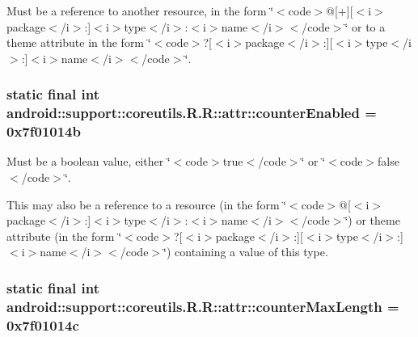 Must be a reference to another resource, in the form \char`\"{}$<$code$>$@\mbox{[}+\mbox{]}\mbox{[}$<$i$>$package$<$/i$>$:\mbox{]}$<$i$>$type$<$/i$>$:$<$i$>$name$<$/i$>$$<$/code$>$\char`\"{} or to a theme attribute in the form \char`\"{}$<$code$>$?\mbox{[}$<$i$>$package$<$/i$>$:\mbox{]}\mbox{[}$<$i$>$type$<$/i$>$:\mbox{]}$<$i$>$name$<$/i$>$$<$/code$>$\char`\"{}. \hypertarget{classandroid_1_1support_1_1coreutils_1_1_r_1_1attr_31dd65cecffac7130170d9f63a11055b}{
\subsubsection[{counterEnabled}]{\setlength{\rightskip}{0pt plus 5cm}static final int android::support::coreutils.R.R::attr::counterEnabled = 0x7f01014b}}
\label{classandroid_1_1support_1_1coreutils_1_1_r_1_1attr_31dd65cecffac7130170d9f63a11055b}


Must be a boolean value, either \char`\"{}$<$code$>$true$<$/code$>$\char`\"{} or \char`\"{}$<$code$>$false$<$/code$>$\char`\"{}. 

This may also be a reference to a resource (in the form \char`\"{}$<$code$>$@\mbox{[}$<$i$>$package$<$/i$>$:\mbox{]}$<$i$>$type$<$/i$>$:$<$i$>$name$<$/i$>$$<$/code$>$\char`\"{}) or theme attribute (in the form \char`\"{}$<$code$>$?\mbox{[}$<$i$>$package$<$/i$>$:\mbox{]}\mbox{[}$<$i$>$type$<$/i$>$:\mbox{]}$<$i$>$name$<$/i$>$$<$/code$>$\char`\"{}) containing a value of this type. \hypertarget{classandroid_1_1support_1_1coreutils_1_1_r_1_1attr_3200a25041c0685a9bb02330d4123cb9}{
\subsubsection[{counterMaxLength}]{\setlength{\rightskip}{0pt plus 5cm}static final int android::support::coreutils.R.R::attr::counterMaxLength = 0x7f01014c}}
\label{classandroid_1_1support_1_1coreutils_1_1_r_1_1attr_3200a25041c0685a9bb02330d4123cb9}


